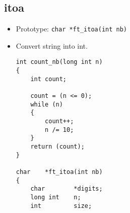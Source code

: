 \documentclass{article}
\begin{document}
	\subsection{itoa}
		\begin{itemize}[label=$\rightarrow$]
			\item Prototype: \texttt{char *ft\_itoa(int nb)}
			\item Convert string into int.
			\begin{verbatim}
int count_nb(long int n)                                                        
{                                                                               
    int count;                                                                  
                                                                                
    count = (n <= 0);                                                           
    while (n)                                                                   
    {                                                                           
        count++;                                                                
        n /= 10;                                                                
    }                                                                           
    return (count);                                                             
}                                                                               
                                                                                
char    *ft_itoa(int nb)                                                        
{                                                                               
    char        *digits;                                                        
    long int    n;                                                              
    int         size;                                                           
                                                                                

\end{verbatim}
\end{itemize}
\end{document}
